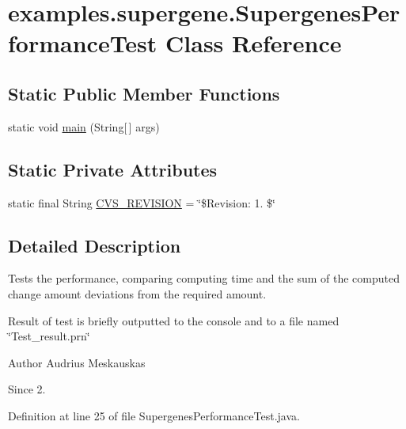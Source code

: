 \hypertarget{classexamples_1_1supergene_1_1_supergenes_performance_test}{\section{examples.\-supergene.\-Supergenes\-Performance\-Test Class Reference}
\label{classexamples_1_1supergene_1_1_supergenes_performance_test}
}
\subsection*{Static Public Member Functions}
\begin{DoxyCompactItemize}
\item 
static void \hyperlink{classexamples_1_1supergene_1_1_supergenes_performance_test_a99329d8a50cf38ede9cd76264fbab553}{main} (String\mbox{[}$\,$\mbox{]} args)
\end{DoxyCompactItemize}
\subsection*{Static Private Attributes}
\begin{DoxyCompactItemize}
\item 
static final String \hyperlink{classexamples_1_1supergene_1_1_supergenes_performance_test_a6fddac869d7110172d8126a249d899a8}{C\-V\-S\-\_\-\-R\-E\-V\-I\-S\-I\-O\-N} = \char`\"{}\$Revision\-: 1. \$\char`\"{}
\end{DoxyCompactItemize}


\subsection{Detailed Description}
Tests the performance, comparing computing time and the sum of the computed change amount deviations from the required amount. 

Result of test is briefly outputted to the console and to a file named \char`\"{}\-Test\-\_\-result.\-prn\char`\"{}

\begin{DoxyAuthor}{Author}
Audrius Meskauskas 
\end{DoxyAuthor}
\begin{DoxySince}{Since}
2. 
\end{DoxySince}


Definition at line 25 of file Supergenes\-Performance\-Test.\-java.



